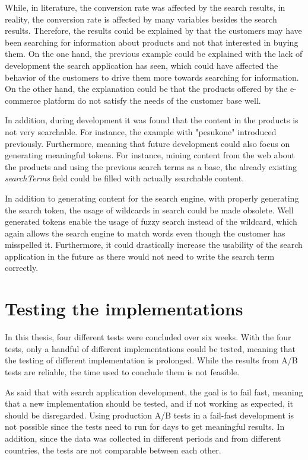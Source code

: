 While, in literature, the conversion rate was affected by the search results, in reality, the conversion
rate is affected by many variables besides the search results.
Therefore, the results could be explained by 
that the customers may have been searching for information about products and 
not that interested in buying them.
On the one hand, the previous example could be explained with the lack of development the search application has seen, 
which could have affected the behavior of the customers to drive them more towards searching for information.
On the other hand, the explanation could be 
that the products offered by the e-commerce platform do not satisfy the needs of the customer base well.

In addition, during development it was found that the content in the products is not very searchable.
For instance, the example with "pesukone" introduced previously.
Furthermore, meaning that future development could also focus on generating meaningful tokens.
For instance, mining content from the web about the products and using the previous search terms as a base,
the already existing \emph{searchTerms} field could be filled with actually searchable content.

In addition to generating content for the search engine, with properly generating the search token,
the usage of wildcards in search could be made obsolete.
Well generated tokens enable the usage of fuzzy search instead of the wildcard, which again allows
the search engine to match words even though the customer has misspelled it.
Furthermore, it could drastically increase the usability of the search application in the future as there would not 
need to write the search term correctly.


\section{Testing the implementations}

In this thesis, four different tests were concluded over six weeks.
With the four tests, only a handful of different implementations could be tested, meaning that the testing
of different implementation is prolonged.
While the results from A/B tests are reliable, the time used to conclude them is not feasible.


As \citeauthor{relevantSearch} \cite{relevantSearch} said that with search application development, the goal
is to fail fast, meaning that a new implementation should be tested, and if not working as expected,
it should be disregarded. 
Using production A/B tests in a fail-fast development is not possible since the tests need to run for days
to get meaningful results.
In addition, since the data was collected in different periods and from different countries, the tests
are not comparable between each other.


